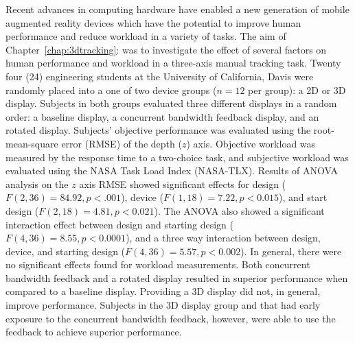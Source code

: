 Recent advances in computing hardware have enabled a new generation of mobile augmented reality devices which have the potential to improve human performance and reduce workload in a variety of tasks.
The aim of Chapter~\ref{chap:3dtracking}:  was to investigate the effect of several factors on human performance and workload in a three-axis manual tracking task.
Twenty four (24) engineering students at the University of California, Davis were randomly placed into a one of two device groups ($n=12$ per group): a 2D or 3D display.
Subjects in both groups evaluated three different displays in a random order: a baseline display, a concurrent bandwidth feedback display, and an rotated display.
Subjects' objective performance was evaluated using the root-mean-square error (RMSE) of the depth ($z$) axis.
Objective workload was measured by the response time to a two-choice task, and subjective workload was evaluated using the NASA Task Load Index (NASA-TLX).
Results of ANOVA analysis on the $z$ axis RMSE showed significant effects for design ($F(2, 36)=84.92, p<.001$), device ($F(1, 18)=7.22, p<0.015$), and start design ($F(2, 18)=4.81, p<0.021$).
The ANOVA also showed a significant interaction effect between design and starting design ($F(4, 36)=8.55, p<0.0001$), and a three way interaction between design, device, and starting design ($F(4, 36)=5.57, p<0.002$).
In general, there were no significant effects found for workload measurements.
Both concurrent bandwidth feedback and a rotated display resulted in superior performance when compared to a baseline display.
Providing a 3D display did not, in general, improve performance.
Subjects in the 3D display group and that had early exposure to the concurrent bandwidth feedback, however, were able to use the feedback to achieve superior performance.

